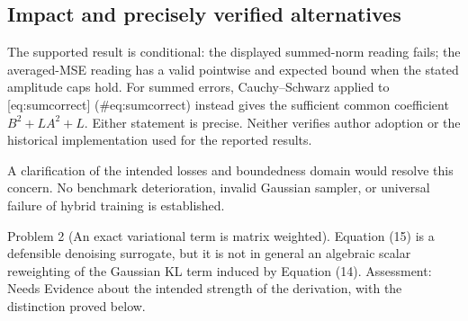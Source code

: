 \documentclass[10pt]{article}
\begin{document}
\subsection*{Impact and precisely verified alternatives}
The supported result is conditional: the displayed summed-norm reading fails; the averaged-MSE reading has a valid pointwise and expected bound when the stated amplitude caps hold. For summed errors, Cauchy–Schwarz applied to [eq:sumcorrect] (\#eq:sumcorrect) instead gives the sufficient common coefficient \(B^2+LA^2+L\). Either statement is precise. Neither verifies author adoption or the historical implementation used for the reported results.\par
A clarification of the intended losses and boundedness domain would resolve this concern. No benchmark deterioration, invalid Gaussian sampler, or universal failure of hybrid training is established.\par
Problem 2 (An exact variational term is matrix weighted).  Equation (15) is a defensible denoising surrogate, but it is not in general an algebraic scalar reweighting of the Gaussian KL term induced by Equation (14). Assessment: Needs Evidence about the intended strength of the derivation, with the distinction proved below.\par
\end{document}
